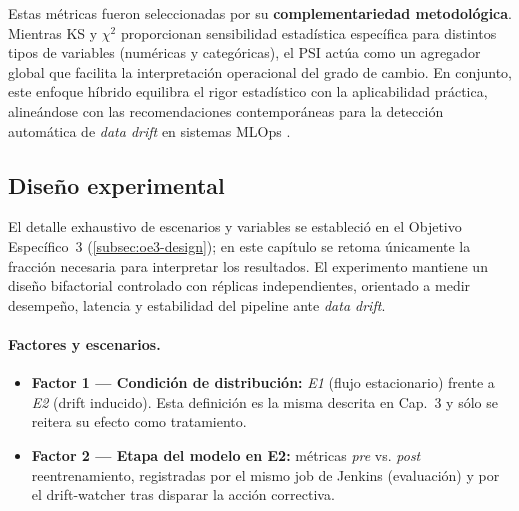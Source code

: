 Estas métricas fueron seleccionadas por su \textbf{complementariedad metodológica}. Mientras KS y $\chi^2$ proporcionan sensibilidad estadística específica para distintos tipos de variables (numéricas y categóricas), el PSI actúa como un agregador global que facilita la interpretación operacional del grado de cambio. En conjunto, este enfoque híbrido equilibra el rigor estadístico con la aplicabilidad práctica, alineándose con las recomendaciones contemporáneas para la detección automática de \textit{data drift} en sistemas MLOps \citep{Gama2014,Zliobaite2016,DeSousa2023}.


\subsection{Diseño experimental}
\label{subsec:eval-design-formal}

El detalle exhaustivo de escenarios y variables se estableció en el Objetivo Específico~3 (\autoref{subsec:oe3-design}); en este capítulo se retoma únicamente la fracción necesaria para interpretar los resultados. El experimento mantiene un diseño bifactorial controlado con réplicas independientes, orientado a medir desempeño, latencia y estabilidad del pipeline ante \textit{data drift}.

\paragraph{Factores y escenarios.}
\begin{itemize}\setlength\itemsep{2pt}
  \item \textbf{Factor 1 — Condición de distribución:} \textit{E1} (flujo estacionario) frente a \textit{E2} (drift inducido). Esta definición es la misma descrita en Cap.~3 y sólo se reitera su efecto como tratamiento.
  \item \textbf{Factor 2 — Etapa del modelo en E2:} métricas \textit{pre} vs. \textit{post} reentrenamiento, registradas por el mismo job de Jenkins (evaluación) y por el drift-watcher tras disparar la acción correctiva.
\end{itemize}

